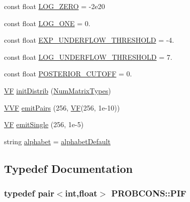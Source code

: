 \begin{DoxyCompactItemize}
\item 
const float \hyperlink{namespace_p_r_o_b_c_o_n_s_ae5514101b91c6ae08ed2ee9306d2305d}{L\+O\+G\+\_\+\+Z\+E\+R\+O} = -\/2e20
\item 
const float \hyperlink{namespace_p_r_o_b_c_o_n_s_a5b8b50011bc3908106307aacd3a58d6e}{L\+O\+G\+\_\+\+O\+N\+E} = 0.
\item 
const float \hyperlink{namespace_p_r_o_b_c_o_n_s_a4074cb3928409c0f0b0d7fce9d2576b0}{E\+X\+P\+\_\+\+U\+N\+D\+E\+R\+F\+L\+O\+W\+\_\+\+T\+H\+R\+E\+S\+H\+O\+L\+D} = -\/4.
\item 
const float \hyperlink{namespace_p_r_o_b_c_o_n_s_acbc36709b1c9a80fa2ec8ead6e1a73ee}{L\+O\+G\+\_\+\+U\+N\+D\+E\+R\+F\+L\+O\+W\+\_\+\+T\+H\+R\+E\+S\+H\+O\+L\+D} = 7.
\item 
const float \hyperlink{namespace_p_r_o_b_c_o_n_s_af5a75afbb515bc75473200f8a3ba1993}{P\+O\+S\+T\+E\+R\+I\+O\+R\+\_\+\+C\+U\+T\+O\+F\+F} = 0.
\item 
\hyperlink{namespace_p_r_o_b_c_o_n_s_a7d46b91dfef3fa4038545a492ad12221}{V\+F} \hyperlink{namespace_p_r_o_b_c_o_n_s_a4fa8c099c73924e7f54dc5dbf2377aff}{init\+Distrib} (\hyperlink{namespace_p_r_o_b_c_o_n_s_aa757f46fbcab58d09517a449a680db3b}{Num\+Matrix\+Types})
\item 
\hyperlink{namespace_p_r_o_b_c_o_n_s_a64c77882f700f0f6e9426241c7d7ba1c}{V\+V\+F} \hyperlink{namespace_p_r_o_b_c_o_n_s_ae28575916501eeab36245ba0624d0640}{emit\+Pairs} (256, \hyperlink{namespace_p_r_o_b_c_o_n_s_a7d46b91dfef3fa4038545a492ad12221}{V\+F}(256, 1e-\/10))
\item 
\hyperlink{namespace_p_r_o_b_c_o_n_s_a7d46b91dfef3fa4038545a492ad12221}{V\+F} \hyperlink{namespace_p_r_o_b_c_o_n_s_a60ce52cd8ccb26631e13fecca788f13e}{emit\+Single} (256, 1e-\/5)
\item 
string \hyperlink{namespace_p_r_o_b_c_o_n_s_a1e5ecbd30c93a113dcef4ef53f00d110}{alphabet} = \hyperlink{namespace_p_r_o_b_c_o_n_s_ae29cac54ccf09bf5f57237867b6da88b}{alphabet\+Default}
\end{DoxyCompactItemize}


\subsection{Typedef Documentation}
\hypertarget{namespace_p_r_o_b_c_o_n_s_a397767dfc075ae6ba7e480f5f06edc32}{
\subsubsection[{P\+I\+F}]{\setlength{\rightskip}{0pt plus 5cm}typedef pair$<$int,float$>$ {\bf P\+R\+O\+B\+C\+O\+N\+S\+::\+P\+I\+F}}}\label{namespace_p_r_o_b_c_o_n_s_a397767dfc075ae6ba7e480f5f06edc32}


